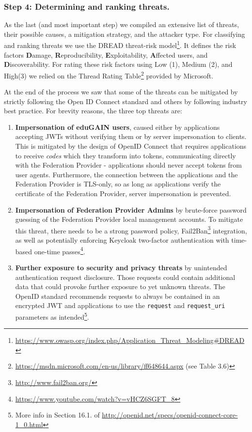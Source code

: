 \documentclass{llncs}
\begin{document}
\subsubsection{Step 4: Determining and ranking threats.}

As the last (and most important step) we compiled an extensive list of threats, their possible causes, a mitigation strategy, and the attacker type. For classifying and ranking threats we use the DREAD threat-risk model\footnote{\url{https://www.owasp.org/index.php/Application\_Threat\_Modeling\#DREAD}}. It defines the risk factors \textbf{D}amage, \textbf{R}eproducibility, \textbf{E}xploitability, \textbf{A}ffected users, and \textbf{D}iscoverability. For rating these risk factors using Low (1), Medium (2), and High(3) we relied on the Thread Rating Table\footnote{\url{https://msdn.microsoft.com/en-us/library/ff648644.aspx} (see Table 3.6)} provided by Microsoft.

At the end of the process we saw that some of the threats can be mitigated by strictly following the Open ID Connect standard and others by following industry best practice. For brevity reasons, the three top threats are:

\begin{enumerate}
	\item \textbf{Impersonation of eduGAIN users}, caused either by applications accepting JWTs without verifying them or by server impersonation to clients. This is mitigated by the design of OpenID Connect that requires applications to receive \textit{codes} which they transform into tokens, communicating directly with the Federation Provider - applications should never accept tokens from user agents. Furthermore, the connection between the applications and the Federation Provider is TLS-only, so as long as applications verify the certificate of the Federation Provider, server impersonation is prevented.
	\item \textbf{Impersonation of Federation Provider Admins} by brute-force password guessing of the Federation Provider local management accounts. To mitigate this threat, there needs to be a strong password policy, Fail2Ban\footnote{\url{http://www.fail2ban.org/}} integration, as well as potentially enforcing Keycloak two-factor authentication with time-based one-time passes\footnote{\url{https://www.youtube.com/watch?v=vHCZ6SGFT\_8}}.
	\item \textbf{Further exposure to security and privacy threats} by unintended authentication request disclosure. Those requests could contain additional data that could provoke further exposure to yet unknown threats. The OpenID standard recommends requests to always be contained in an encrypted JWT and applications to use the \texttt{request} and \texttt{request\_uri} parameters as intended\footnote{More info in Section 16.1. of \url{http://openid.net/specs/openid-connect-core-1\_0.html}}.
\end{enumerate}
\end{document}
